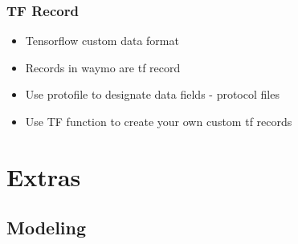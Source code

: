 \documentclass[11pt,xcolor={dvipsnames},usepdftitle=false]{beamer}
\begin{document}
\begin{frame}
  \frametitle{TF Record}

  \begin{itemize}
    \small\item Tensorflow custom data format
    \small\item Records in waymo are tf record
    \small\item Use protofile to designate data fields - protocol files
    \small\item Use TF function to create your own custom tf records
  \end{itemize}

\end{frame}

\begin{frame}
  \frametitle{Exercise - 003 - TFRecord

  \begin{itemize}
    \small\item 
  \end{itemize}

\end{frame}



\section{Extras}
\subsection{Modeling}
\end{document}
